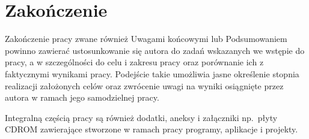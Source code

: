 \chapter{Zakończenie}

Zakończenie pracy zwane również Uwagami końcowymi lub Podsumowaniem powinno zawierać ustosunkowanie
się autora do zadań wskazanych we wstępie do pracy, a w szczególności do celu i zakresu pracy oraz
porównanie ich z faktycznymi wynikami pracy. Podejście takie umożliwia jasne określenie stopnia
realizacji założonych celów oraz zwrócenie uwagi na wyniki osiągnięte przez autora w ramach jego
samodzielnej pracy.

Integralną częścią pracy są również dodatki, aneksy i załączniki np.~płyty CDROM
zawierające stworzone w ramach pracy programy, aplikacje i projekty.
